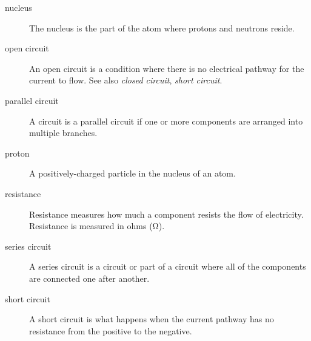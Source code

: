 \begin{description}
\item[nucleus] The nucleus is the part of the atom where protons and neutrons reside. 
\item[open circuit] An open circuit is a condition where there is no electrical pathway for the current to flow.  See also \emph{closed circuit}, \emph{short circuit}.
\item[parallel circuit] A circuit is a parallel circuit if one or more components are arranged into multiple branches.
\item[proton] A positively-charged particle in the nucleus of an atom.
\item[resistance] Resistance measures how much a component resists the flow of electricity.  Resistance is measured in ohms (\si{\ohm}).
\item[series circuit] A series circuit is a circuit or part of a circuit where all of the components are connected one after another.
\item[short circuit] A short circuit is what happens when the current pathway has no resistance from the positive to the negative.
\end{description}
